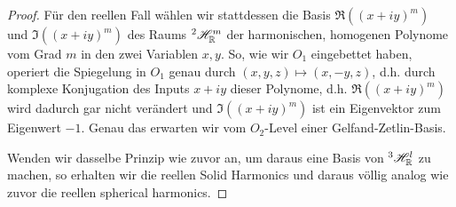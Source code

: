 \begin{proof}
\medbreak
Für den reellen Fall wählen wir stattdessen die Basis $\Re( (x+iy)^m )$ und $\Im( (x+iy)^m )$ des Raums ${^2 \mathscr{H}_{\mathbb{R}}^m}$ der harmonischen, homogenen Polynome vom Grad $m$ in den zwei Variablen $x,y$. So, wie wir $O_1$ eingebettet haben, operiert die Spiegelung in $O_1$ genau durch $(x,y,z)\mapsto(x,-y,z)$, d.h. durch komplexe Konjugation des Inputs $x+iy$ dieser Polynome, d.h. $\Re((x+iy)^m)$ wird dadurch gar nicht verändert und $\Im((x+iy)^m)$ ist ein Eigenvektor zum Eigenwert $-1$. Genau das erwarten wir vom $O_2$-Level einer Gelfand-Zetlin-Basis.

Wenden wir dasselbe Prinzip wie zuvor an, um daraus eine Basis von ${^3\mathscr{H}_{\mathbb{R}}^l}$ zu machen, so erhalten wir die reellen Solid Harmonics und daraus völlig analog wie zuvor die reellen spherical harmonics.
\end{proof}

